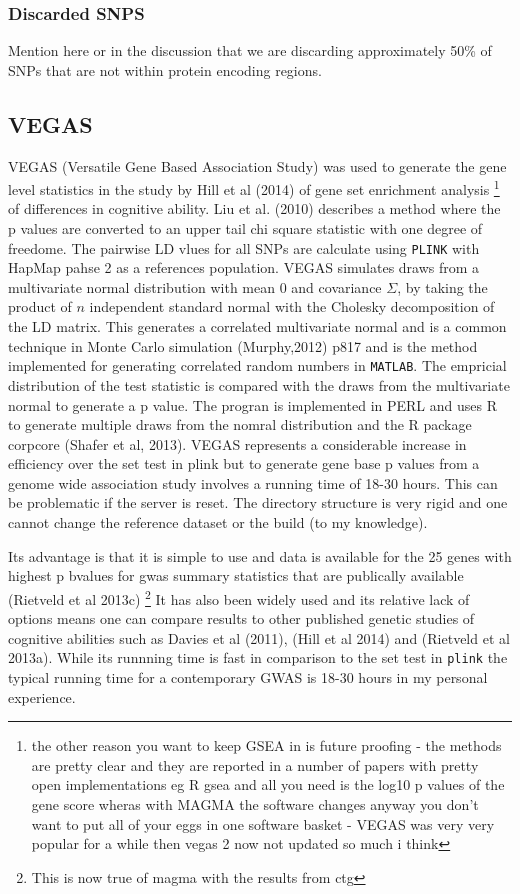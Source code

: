 \subsubsection{Discarded SNPS}
Mention here or in the discussion that we are discarding approximately 50\% of SNPs that are not within protein encoding regions. 

\subsection{VEGAS}
VEGAS (Versatile Gene Based Association Study) was used to generate the gene level statistics in the study by Hill et al (2014) of gene set enrichment analysis \footnote{the other reason you want to keep GSEA in is future proofing - the methods are pretty clear and they are reported in a number of papers with pretty open implementations eg R gsea and all you need is the log10 p values of the gene score wheras with MAGMA the software changes anyway you don't want to put all of your eggs in one software basket - VEGAS was very very popular for a while then vegas 2 now not updated so much i think} of differences in cognitive ability. Liu et al. (2010) describes a method where the p values are converted to an upper tail chi square statistic with one degree of freedome. The pairwise LD vlues for all SNPs are calculate using \texttt{PLINK} with HapMap pahse 2 as a references population. VEGAS simulates draws from a multivariate normal distribution with mean 0 and covariance $\Sigma$, by taking the product of $n$ independent standard normal with the Cholesky decomposition of the LD matrix. This generates a correlated multivariate normal and is a common technique in Monte Carlo simulation (Murphy,2012) p817 and is the method implemented for generating correlated random numbers in \texttt{MATLAB}. The empricial distribution of the test statistic is compared with the draws from the multivariate normal to generate a p value. The progran is implemented in PERL and uses R to generate multiple draws from the nomral distribution and the R package corpcore (Shafer et al, 2013).
VEGAS represents a considerable increase in efficiency over the set test in plink but to generate gene base p values from a genome wide association study involves a running time of 18-30 hours. This can be problematic if the server is reset. The directory structure is very rigid and one cannot change the reference dataset or the build (to my knowledge). 

Its advantage is that it is simple to use and data is available for the 25 genes with highest p bvalues for gwas summary statistics that are publically available (Rietveld et al 2013c) \footnote{This is now true of magma with the results from ctg} It has also been widely used and its relative lack of options means one can compare results to other published genetic studies of cognitive abilities such as Davies et al (2011), (Hill et al 2014) and (Rietveld et al 2013a). While its runnning time is fast in comparison to the set test in \texttt{plink} the typical running time for a contemporary GWAS is 18-30 hours in my personal experience.

